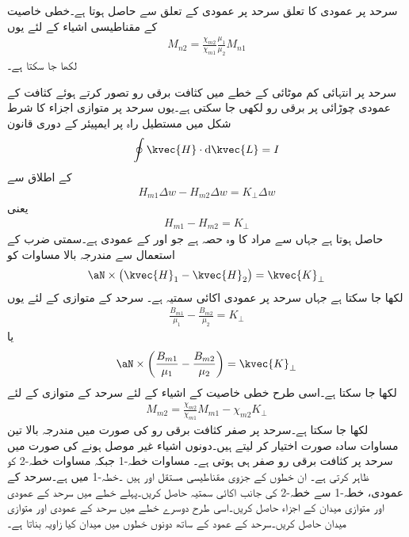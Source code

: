 سرحد پر عمودی  کا تعلق سرحد پر عمودی  کے تعلق سے حاصل ہوتا ہے۔خطی خاصیت کے مقناطیسی اشیاء کے لئے یوں
\begin{align}
M_{n2}=\frac{\chi_{m2}}{\chi_{m1}}\frac{\mu_1}{\mu_2}M_{n1}
\end{align}
لکھا جا سکتا ہے۔

سرحد پر انتہائی کم موٹائی کے خطے میں کثافت برقی رو  تصور کرتے ہوئے کثافت کے عمودی  چوڑائی پر برقی رو  لکھی جا سکتی ہے۔یوں سرحد پر متوازی اجزاء کا شرط شکل میں مستطیل راہ پر ایمپیئر کے دوری قانون
\begin{align*}
\oint \kvec{H} \cdot \dif \kvec{L}=I
\end{align*}
کے اطلاق سے
\begin{align*}
H_{m1} \Delta w -H_{m2}\Delta w=K_\perp \Delta w
\end{align*}
یعنی
\begin{align}
H_{m1} -H_{m2}=K_\perp
\end{align}
 حاصل ہوتا ہے جہاں  سے مراد  کا وہ حصہ ہے جو  اور  کے عمودی ہے۔سمتی ضرب کے استعمال سے مندرجہ بالا مساوات کو
\begin{align}
\aN \times \left(\kvec{H}_1-\kvec{H}_2 \right)  =\kvec{K}_{\perp}
\end{align}
لکھا جا سکتا ہے جہاں  سرحد پر عمودی اکائی سمتیہ  ہے۔ سرحد کے متوازی  کے لئے یوں
\begin{align}
\frac{B_{m1}}{\mu_1}-\frac{B_{m2}}{\mu_2}=K_\perp
\end{align}
یا
\begin{align}
\aN \times \left(\frac{B_{m1}}{\mu_1}-\frac{B_{m2}}{\mu_2}\right)=\kvec{K}_\perp
\end{align}
لکھا جا سکتا ہے۔اسی طرح خطی خاصیت کے اشیاء کے لئے سرحد کے متوازی  کے لئے
\begin{align}
M_{m2}=\frac{\chi_{m2}}{\chi_{m1}} M_{m1}-\chi_{m2} K_\perp
\end{align}
لکھا جا سکتا ہے۔سرحد پر صفر کثافت برقی رو کی صورت میں مندرجہ بالا تین مساوات سادہ صورت اختیار کر لیتے ہیں۔دونوں اشیاء غیر موصل ہونے کی صورت میں سرحد پر کثافت برقی رو صفر ہی ہوتی ہے۔
مساوات  خطہ-1 جبکہ مساوات  خطہ-2 کو ظاہر کرتی ہے۔ ان خطوں کے جزوی مقناطیسی مستقل  اور  ہیں ۔خطہ-1 میں  ہے۔سرحد کے عمودی، خطہ-1 سے خطہ-2 کی جانب  اکائی سمتیہ  حاصل کریں۔پہلے خطے  میں سرحد کے عمودی اور متوازی میدان کے اجزاء حاصل کریں۔اسی طرح دوسرے خطے میں سرحد کے عمودی اور متوازی میدان حاصل کریں۔سرحد کے عمود کے ساتھ دونوں خطوں میں میدان کیا زاویہ بناتا ہے۔

